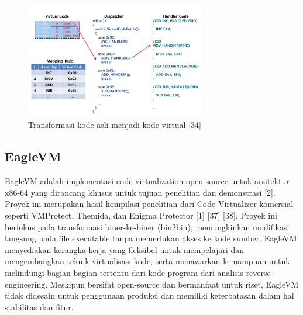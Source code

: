 \begin{figure}
	\centering
	\includegraphics[width=0.7\textwidth]
	{assets/pics/code_to_virtualized.png}
	\caption{Transformasi kode asli menjadi kode virtual [34]}
\end{figure}

\subsection{EagleVM}
EagleVM adalah implementasi code virtualization open-source untuk arsitektur x86-64 yang dirancang khusus untuk tujuan penelitian dan demonstrasi [2]. Proyek ini merupakan hasil kompilasi penelitian dari Code Virtualizer komersial seperti VMProtect, Themida, dan Enigma Protector [1] [37] [38]. Proyek ini berfokus pada transformasi biner-ke-biner (bin2bin), memungkinkan modifikasi langsung pada file executable tanpa memerlukan akses ke kode sumber. EagleVM menyediakan kerangka kerja yang fleksibel untuk mempelajari dan mengembangkan teknik virtualisasi kode, serta menawarkan kemampuan untuk melindungi bagian-bagian tertentu dari kode program dari analisis reverse-engineering. Meskipun bersifat open-source dan bermanfaat untuk riset, EagleVM tidak didesain untuk penggunaan produksi dan memiliki keterbatasan dalam hal stabilitas dan fitur.

